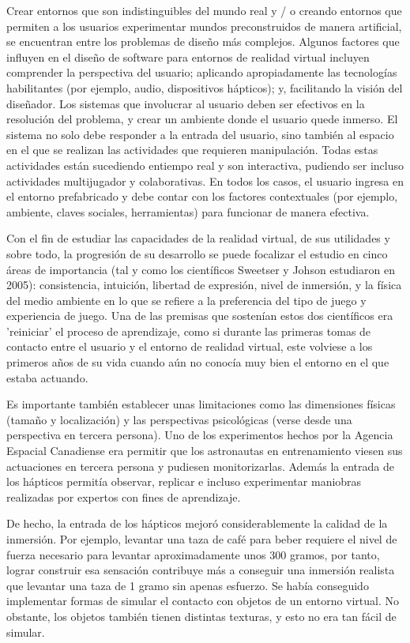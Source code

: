 \documentclass[twoside,twocolumn]{article}
\begin{document}
Crear entornos que son indistinguibles del mundo real y / o creando entornos que permiten a los usuarios experimentar mundos preconstruidos de manera artificial, se encuentran entre los problemas de diseño más complejos.
Algunos factores que influyen en el diseño de software para entornos de realidad virtual incluyen comprender la perspectiva del usuario; aplicando apropiadamente las tecnologías habilitantes (por ejemplo, audio, dispositivos hápticos); y, facilitando la visión del diseñador. Los sistemas que involucrar al usuario  deben ser efectivos en la resolución del problema, y crear un ambiente donde el usuario quede inmerso. El sistema no solo debe responder a la entrada del usuario, sino también al espacio en el que se realizan las actividades que requieren manipulación. Todas estas actividades están sucediendo entiempo real y son interactiva, pudiendo ser incluso actividades multijugador y colaborativas. En todos los casos, el usuario ingresa en el entorno prefabricado y debe contar con los factores contextuales (por ejemplo, ambiente, claves sociales, herramientas) para funcionar de manera efectiva.

Con el fin de estudiar las capacidades de la realidad virtual, de sus utilidades y sobre todo, la progresión de su desarrollo se puede focalizar el estudio en cinco áreas de importancia (tal y como los científicos Sweetser y Johson estudiaron en 2005): consistencia, intuición, libertad de expresión, nivel de inmersión, y la física del medio ambiente en lo que se refiere a la preferencia del tipo de juego y experiencia de juego. Una de las premisas que sostenían estos dos científicos era 'reiniciar' el proceso de aprendizaje, como si durante las primeras tomas de contacto entre el usuario y el entorno de realidad virtual, este volviese a los primeros años de su vida cuando aún no conocía muy bien el entorno en el que estaba actuando.

Es importante también establecer unas limitaciones como las dimensiones físicas (tamaño y localización) y las perspectivas psicológicas (verse desde una perspectiva en tercera persona).  Uno de los experimentos hechos por la Agencia Espacial Canadiense era permitir que los astronautas en entrenamiento viesen sus actuaciones en tercera persona y pudiesen monitorizarlas. Además la entrada de los hápticos permitía observar, replicar e incluso experimentar maniobras realizadas por expertos con fines de aprendizaje.

De hecho, la entrada de los hápticos mejoró considerablemente la calidad de la inmersión. Por ejemplo, levantar una taza de café para beber requiere el nivel de fuerza necesario para levantar aproximadamente unos 300 gramos, por tanto, lograr construir esa sensación contribuye más a conseguir una inmersión realista que levantar una taza de 1 gramo sin apenas esfuerzo. Se había conseguido implementar formas de simular el contacto con objetos de un entorno virtual. No obstante, los objetos también tienen distintas texturas, y esto no era tan fácil de simular.
\end{document}
